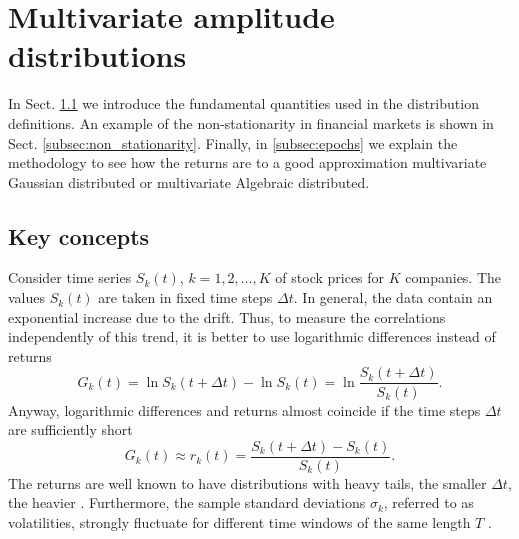 \section{Multivariate amplitude distributions}
\label{sec:epochs}

In Sect. \ref{subsec:key_concepts} we introduce the fundamental quantities
used in the distribution definitions. An example of the non-stationarity in
financial markets is shown in Sect. \ref{subsec:non_stationarity}. Finally, in
\ref{subsec:epochs} we explain the methodology to see how the returns are to a
good approximation multivariate Gaussian distributed or multivariate Algebraic
distributed.

\subsection{Key concepts}\label{subsec:key_concepts}

Consider time series $S_{k} \left( t \right)$, $k = 1, 2, \ldots, K$ of stock
prices for $K$ companies. The values $S_{k} \left( t \right)$ are taken in
fixed time steps $\Delta t$. In general, the data contain an exponential
increase due to the drift. Thus, to measure the correlations independently of
this trend, it is better to use logarithmic differences instead of returns
\begin{equation}
    G_{k} \left( t \right) = \ln S_{k} \left( t + \Delta t \right) -
    \ln S_{k} \left(t \right) = \ln \frac{S_{k} \left( t + \Delta t \right)}
    {S_{k} \left(t \right)}.
\end{equation}
Anyway, logarithmic differences and returns almost coincide if the time steps
$\Delta t$ are sufficiently short \cite{subtle_nature,empirical_facts}
\begin{equation}
    G_{k} \left(t\right) \approx r_{k} \left(t\right)
    = \frac{S_{k} \left( t + \Delta t \right) - S_{k} \left( t \right)}
    {S_{k} \left( t \right)}.
\end{equation}
The returns are well known to have distributions with heavy tails, the smaller
$\Delta t$, the heavier \cite{non_stationarity_fin_guhr}. Furthermore, the
sample standard deviations $\sigma_{k}$, referred to as volatilities, strongly
fluctuate for different time windows of the same length $T$
\cite{non_stationarity_fin_guhr,volatility_change}.

